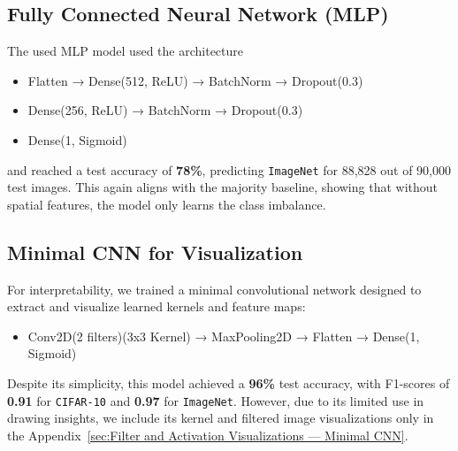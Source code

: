 
\subsection{Fully Connected Neural Network (MLP)}
The used MLP model used the architecture
\begin{itemize}
    \item Flatten → Dense(512, ReLU) → BatchNorm → Dropout(0.3)
    \item Dense(256, ReLU) → BatchNorm → Dropout(0.3)
    \item Dense(1, Sigmoid)
\end{itemize}
and reached a test accuracy of \textbf{78\%}, predicting \texttt{ImageNet} for 88,828 out of 90,000 test images. 
This again aligns with the majority baseline, showing that without spatial features, the model only learns the class imbalance.

\subsection{Minimal CNN for Visualization}
\label{subsec: Minimal CNN for Visualization}
For interpretability, we trained a minimal convolutional network designed to extract and visualize learned kernels and feature maps:
\begin{itemize}
    \item Conv2D(2 filters)(3x3 Kernel) → MaxPooling2D → Flatten → Dense(1, Sigmoid)
\end{itemize}
Despite its simplicity, this model achieved a \textbf{96\%} test accuracy, with F1-scores of \textbf{0.91} for \texttt{CIFAR-10} and \textbf{0.97} for \texttt{ImageNet}. 
However, due to its limited use in drawing insights, we include its kernel and filtered image visualizations only in the 
Appendix~\ref{sec:Filter and Activation Visualizations — Minimal CNN}.

